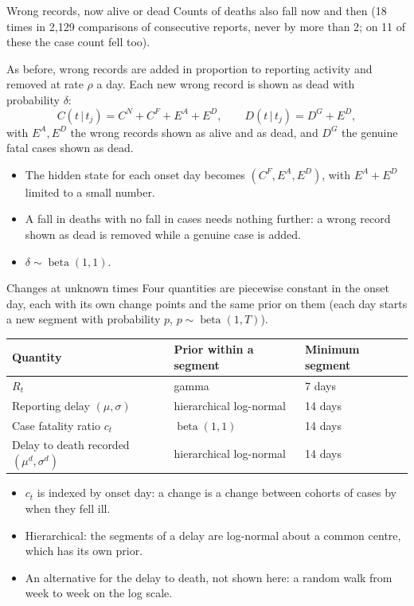 \documentclass[aspectratio=169,9pt]{beamer}
\newcommand{\given}{\,|\,}
\begin{document}
\begin{frame}{Wrong records, now alive or dead}
Counts of deaths also fall now and then (18 times in 2{,}129 comparisons
of consecutive reports, never by more than 2; on 11 of these the case
count fell too).

\bigskip
As before, wrong records are added in proportion to reporting activity and
removed at rate $\rho$ a day. Each new wrong record is shown as dead with
probability $\delta$:
\[
C(t\given t_j)=C^{N}+C^{F}+E^{A}+E^{D},
\qquad
D(t\given t_j)=D^{G}+E^{D},
\]
with $E^{A},E^{D}$ the wrong records shown as alive and as dead, and $D^{G}$
the genuine fatal cases shown as dead.

\bigskip
\begin{itemize}
\item The hidden state for each onset day becomes
$(C^{F},E^{A},E^{D})$, with $E^{A}+E^{D}$ limited to a small number.
\item A fall in deaths with no fall in cases needs nothing further: a wrong
record shown as dead is removed while a genuine case is added.
\item $\delta\sim\operatorname{beta}(1,1)$.
\end{itemize}
\end{frame}

\begin{frame}{Changes at unknown times}
Four quantities are piecewise constant in the onset day, each with its own
change points and the same prior on them (each day starts a new segment
with probability $p$, $p\sim\operatorname{beta}(1,T)$).

\bigskip
\begin{center}
\renewcommand{\arraystretch}{1.35}
\begin{tabular}{lll}
\toprule
Quantity & Prior within a segment & Minimum segment \\
\midrule
$R_t$ & gamma & 7 days \\
Reporting delay $(\mu,\sigma)$ & hierarchical log-normal & 14 days \\
Case fatality ratio $c_t$ & $\operatorname{beta}(1,1)$ & 14 days \\
Delay to death recorded $(\mu^{d},\sigma^{d})$ & hierarchical log-normal & 14 days \\
\bottomrule
\end{tabular}
\end{center}

\bigskip
\begin{itemize}
\item $c_t$ is indexed by onset day: a change is a change between cohorts of
cases by when they fell ill.
\item Hierarchical: the segments of a delay are log-normal about a common
centre, which has its own prior.
\item An alternative for the delay to death, not shown here: a random walk
from week to week on the log scale.
\end{itemize}
\end{frame}
\end{document}
